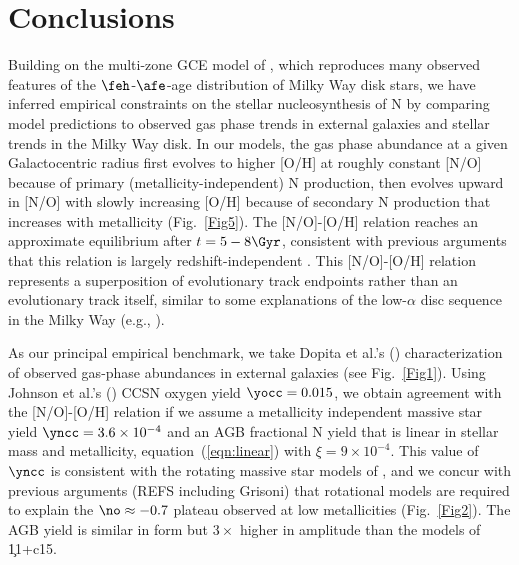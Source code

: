 
\section{Conclusions}
\label{sec:conclusions}

Building on the multi-zone GCE model of \cite{Johnson2021}, which reproduces
many observed features of the $\feh$-$\afe$-age distribution of Milky Way
disk stars, we have inferred empirical constraints on the stellar nucleosynthesis
of N by comparing model predictions to observed gas phase trends in external
galaxies and stellar trends in the Milky Way disk.  In our models, the gas 
phase abundance at a given Galactocentric radius first evolves to higher
[O/H] at roughly constant [N/O] because of primary (metallicity-independent)
N production, then evolves upward in [N/O] with slowly increasing [O/H] because
of secondary N production that increases with metallicity (Fig.~\ref{Fig5}).
The [N/O]-[O/H] relation reaches an approximate equilibrium after $t=5-8\Gyr$,
consistent with previous arguments that this relation is largely 
redshift-independent \citep{Vincenzo2018,Hayden-Pawson2021}.
This [N/O]-[O/H] relation represents a superposition of evolutionary track
endpoints rather than an evolutionary track itself, similar to some explanations
of the low-$\alpha$ disc sequence in the Milky Way
(e.g., \citealt{Schoenrich2009,Nidever2014,Buck2020,Sharma2021,Johnson2021}).

As our principal empirical benchmark, we take Dopita et al.'s 
(\citeyear{Dopita2016}) characterization of observed gas-phase abundances
in external galaxies (see Fig.~\ref{Fig1}).  Using Johnson et al.'s
(\citeyear{Johnson2021}) CCSN oxygen yield $\yocc=0.015$, we obtain
agreement with the \cite{Dopita2016} [N/O]-[O/H] relation if we assume a 
metallicity independent massive star yield $\yncc=3.6 \times 10^{-4}$ and an
AGB fractional N yield that is linear in stellar mass and metallicity,
equation~(\ref{eqn:linear}) with $\xi = 9 \times 10^{-4}$.
This value of $\yncc$ is consistent with the rotating massive star models
of \cite{Limongi2018}, and we concur with previous arguments
(REFS including Grisoni) that rotational models are required to explain
the $\no \approx -0.7$ plateau observed at low metallicities
(Fig.~\ref{Fig2}).  The AGB yield is similar in form but $3\times$ higher
in amplitude than the models of \c11+c15.


